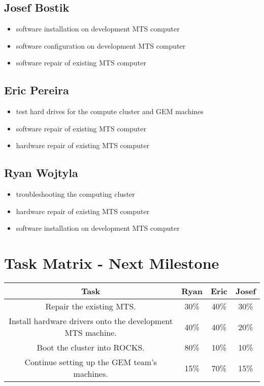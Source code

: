 \documentclass[12pt]{article}
\begin{document}
\subsection{Josef Bostik}

\begin{itemize}
  \item software installation on development MTS computer
  \item software configuration on development MTS computer
  \item software repair of existing MTS computer
\end{itemize}

\subsection{Eric Pereira}

\begin{itemize}
  \item test hard drives for the compute cluster and GEM machines
  \item software repair of existing MTS computer
  \item hardware repair of existing MTS computer
\end{itemize}

\subsection{Ryan Wojtyla}

\begin{itemize}
  \item troubleshooting the computing cluster
  \item hardware repair of existing MTS computer
  \item software installation on development MTS computer
\end{itemize}

\section{Task Matrix - Next Milestone}

\begin{center}
  \begin{tabular}{|c|c|c|c|}
    \hline
    Task & Ryan & Eric & Josef \\
    \hline
    Repair the existing MTS. & 30\% & 40\% & 30\% \\
    Install hardware drivers onto the development MTS machine. & 40\% & 40\% &
                                                                               20\%
    \\
    Boot the cluster into ROCKS. & 80\% & 10\% & 10\% \\
    Continue setting up the GEM team's machines. & 15\% & 70\% & 15\% \\
    \hline
  \end{tabular}
\end{center}
\end{document}
